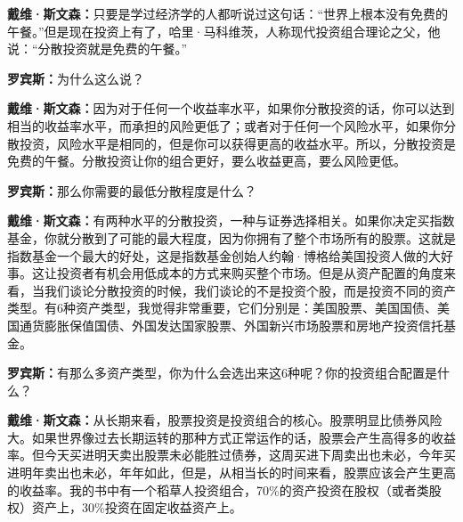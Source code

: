 \begin{BookQuote}
\textbf{戴维·斯文森：}只要是学过经济学的人都听说过这句话：“世界上根本没有免费的午餐。”但是现在投资上有了，哈里·马科维茨，人称现代投资组合理论之父，他说：“分散投资就是免费的午餐。”
\end{BookQuote}

\begin{BookQuote}
\textbf{罗宾斯：}为什么这么说？
\end{BookQuote}

\begin{BookQuote}
\textbf{戴维·斯文森：}因为对于任何一个收益率水平，如果你分散投资的话，你可以达到相当的收益率水平，而承担的风险更低了；或者对于任何一个风险水平，如果你分散投资，风险水平是相同的，但是你可以获得更高的收益水平。所以，分散投资是免费的午餐。分散投资让你的组合更好，要么收益更高，要么风险更低。
\end{BookQuote}

\begin{BookQuote}
\textbf{罗宾斯：}那么你需要的最低分散程度是什么？
\end{BookQuote}

\begin{BookQuote}
\textbf{戴维·斯文森：}有两种水平的分散投资，一种与证券选择相关。如果你决定买指数基金，你就分散到了可能的最大程度，因为你拥有了整个市场所有的股票。这就是指数基金一个最大的好处，这是指数基金创始人约翰·博格给美国投资人做的大好事。这让投资者有机会用低成本的方式来购买整个市场。但是从资产配置的角度来看，当我们谈论分散投资的时候，我们谈论的不是投资个股，而是投资不同的资产类型。有6种资产类型，我觉得非常重要，它们分别是：美国股票、美国国债、美国通货膨胀保值国债、外国发达国家股票、外国新兴市场股票和房地产投资信托基金。
\end{BookQuote}

\begin{BookQuote}
\textbf{罗宾斯：}有那么多资产类型，你为什么会选出来这6种呢？你的投资组合配置是什么？
\end{BookQuote}

\begin{BookQuote}
\textbf{戴维·斯文森：}从长期来看，股票投资是投资组合的核心。股票明显比债券风险大。如果世界像过去长期运转的那种方式正常运作的话，股票会产生高得多的收益率。但今天买进明天卖出股票未必能胜过债券，这周买进下周卖出也未必，今年买进明年卖出也未必，年年如此，但是，从相当长的时间来看，股票应该会产生更高的收益率。我的书中有一个稻草人投资组合，70\%的资产投资在股权（或者类股权）资产上，30\%投资在固定收益资产上。
\end{BookQuote}

